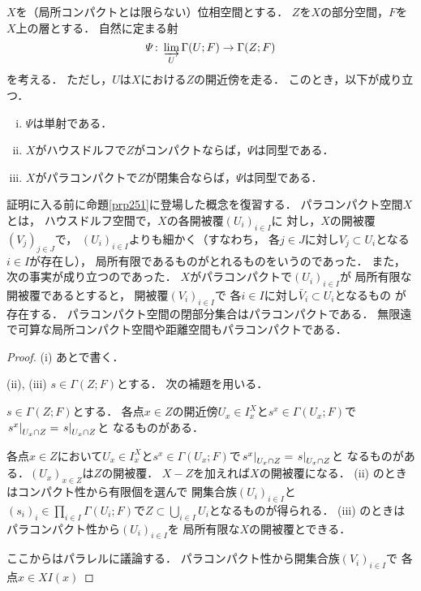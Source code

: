 \begin{PRP}\label{prp251}
    \(X\)を（局所コンパクトとは限らない）位相空間とする．
    \(Z\)を\(X\)の部分空間，\(F\)を\(X\)上の層とする．
    自然に定まる射
    \[
        \varPsi\colon\indlim[U]\Gamma(U;F)\to \Gamma(Z;F)
    \]
    を考える．
    ただし，\(U\)は\(X\)における\(Z\)の開近傍を走る．
    このとき，以下が成り立つ．
    \begin{enumerate}[(i)]
        \item \(\varPsi\)は単射である．
        \item \(X\)がハウスドルフで\(Z\)がコンパクトならば，\(\varPsi\)は同型である．
        \item \(X\)がパラコンパクトで\(Z\)が閉集合ならば，\(\varPsi\)は同型である．
    \end{enumerate}
\end{PRP}
証明に入る前に命題\ref{prp251}に登場した概念を復習する．
パラコンパクト空間\(X\)とは，
ハウスドルフ空間で，\(X\)の各開被覆\(\left(U_i\right)_{i\in I}\)に
対し，\(X\)の開被覆\(\left(V_j\right)_{j\in J}\)で，
\(\left(U_i\right)_{i\in I}\)よりも細かく（すなわち，
各\(j\in J\)に対し\(V_j\subset U_i\)となる\(i\in I\)が存在し），
局所有限であるものがとれるものをいうのであった．
また，次の事実が成り立つのであった．
\(X\)がパラコンパクトで\(\left(U_i\right)_{i\in I}\)が
局所有限な開被覆であるとすると，
開被覆\(\left(V_i\right)_{i\in I}\)で
各\(i\in I\)に対し\(\bar{V}_i\subset U_i\)となるもの
が存在する．
パラコンパクト空間の閉部分集合はパラコンパクトである．
無限遠で可算な局所コンパクト空間や距離空間もパラコンパクトである．
\begin{proof}
    (i) あとで書く．

    (ii), (iii) 
    \(s\in\Gamma(Z;F)\)とする．
    次の補題を用いる．
    \begin{leftbar}
    \begin{LMM*}
        \(s\in\Gamma(Z;F)\)とする．
        各点\(x\in Z\)の開近傍\(U_x\in I_x^X\)と\(
            s^x\in\Gamma(U_x;F)
        \)で\(\mres[s^x]{U_x\cap Z}=\mres[s]{U_x\cap Z}\)と
        なるものがある．
    \end{LMM*}
    \end{leftbar}
    各点\(x\in Z\)において\(U_x\in I_x^X\)と\(
        s^x\in\Gamma(U_x;F)
    \)で\(\mres[s^x]{U_x\cap Z}=\mres[s]{U_x\cap Z}\)と
    なるものがある．\((U_x)_{x\in Z}\)は\(Z\)の開被覆．
    \(X-Z\)を加えれば\(X\)の開被覆になる．
    (ii) のときはコンパクト性から有限個を選んで
    開集合族\((U_i)_{i\in I}\)と\(
        (s_i)_i\in\prod_{i\in I}\Gamma(U_i;F)
    \)で\(Z\subset \bigcup_{i\in I}U_i\)となるものが得られる．
    (iii) のときはパラコンパクト性から\((U_i)_{i\in I}\)を
    局所有限な\(X\)の開被覆とできる．

    ここからはパラレルに議論する．
    パラコンパクト性から開集合族\((V_i)_{i\in I}\)で
    各点\(x\in X\)\(I(x)\)
\end{proof}
